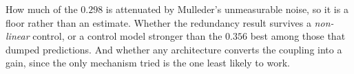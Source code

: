  How much of the $0.298$ is attenuated by Mulleder's unmeasurable noise,
so it is a floor rather than an estimate. Whether the redundancy result survives a
\emph{non-linear} control, or a control model stronger than the $0.356$ best among those
that dumped predictions. And whether any architecture converts the coupling into a gain,
since the only mechanism tried is the one least likely to work.
